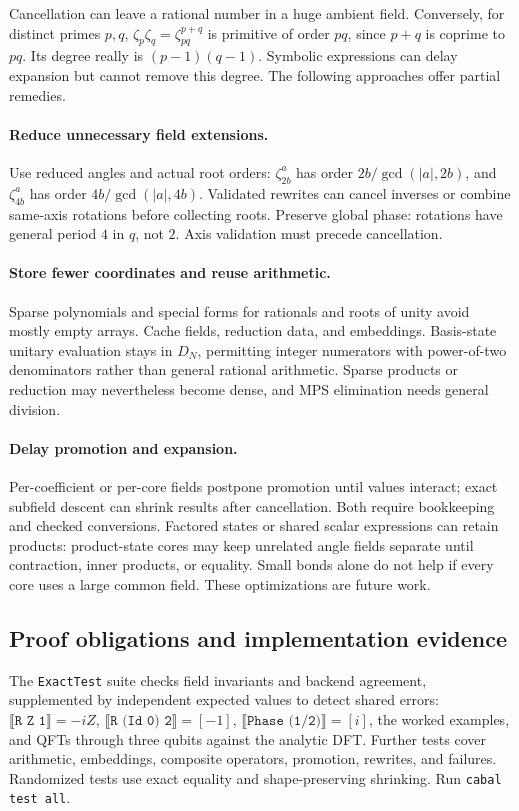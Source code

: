 \documentclass[11pt,a4paper]{article}
\newcommand{\sem}[1]{\llbracket #1\rrbracket}
\newcommand{\code}[1]{\texttt{#1}}
\begin{document}
Cancellation can leave a rational number in a huge ambient field.
Conversely, for distinct primes $p,q$,
$\zeta_p\zeta_q=\zeta_{pq}^{p+q}$ is primitive of order $pq$, since
$p+q$ is coprime to $pq$. Its degree really is $(p-1)(q-1)$.
Symbolic expressions can delay expansion but cannot remove this degree.
The following approaches offer partial remedies.

\paragraph{Reduce unnecessary field extensions.}
Use reduced angles and actual root orders:
$\zeta_{2b}^{a}$ has order $2b/\gcd(|a|,2b)$, and
$\zeta_{4b}^{a}$ has order $4b/\gcd(|a|,4b)$.
Validated rewrites can cancel inverses or combine same-axis rotations
before collecting roots. Preserve global phase: rotations have general
period $4$ in $q$, not $2$. Axis validation must precede cancellation.

\paragraph{Store fewer coordinates and reuse arithmetic.}
Sparse polynomials and special forms for rationals and roots of unity
avoid mostly empty arrays. Cache fields, reduction data, and embeddings.
Basis-state unitary evaluation stays in $D_N$, permitting integer
numerators with power-of-two denominators rather than general rational
arithmetic. Sparse products or reduction may nevertheless become dense,
and MPS elimination needs general division.

\paragraph{Delay promotion and expansion.}
Per-coefficient or per-core fields postpone promotion until values interact;
exact subfield descent can shrink results after cancellation. Both require
bookkeeping and checked conversions. Factored states or shared scalar
expressions can retain products: product-state cores may keep unrelated
angle fields separate until contraction, inner products, or equality.
Small bonds alone do not help if every core uses a large common field.
These optimizations are future work.

\subsection{Proof obligations and implementation evidence}
The \code{ExactTest} suite checks field invariants and backend agreement,
supplemented by independent expected values to detect shared errors:
$\sem{\code{R Z 1}}=-iZ$,
$\sem{\code{R (Id 0) 2}}=[-1]$,
$\sem{\code{Phase (1/2)}}=[i]$,
the worked examples, and QFTs through three qubits against the analytic DFT.
Further tests cover arithmetic, embeddings, composite operators, promotion,
rewrites, and failures. Randomized tests use exact equality and
shape-preserving shrinking. Run \code{cabal test all}.
\end{document}
